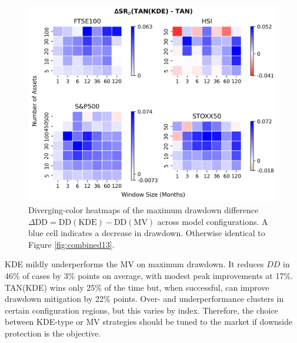 \begin{figure}[H]
  \begin{center}
  \begin{minipage}{1\textwidth}
    \centering
    \includegraphics[width=\textwidth]{images/40_16.png}
  \end{minipage}
  \caption[Heatmap 3]{Diverging-color heatmaps of the maximum drawdown difference $\Delta \text{DD} = \text{DD}(\mathrm{KDE}) - \text{DD}(\mathrm{MV})$ across model configurations. A blue cell indicates a decrease in drawdown. Otherwise identical to Figure \ref{fig:combined13}.}
  \label{fig:combined15}
  \end{center}
  \end{figure}

KDE mildly underperforms the MV on maximum drawdown. It reduces $DD$ in 46\% of cases by 3\% points on average, with modest peak improvements at 17\%. TAN(KDE) wins only 25\% of the time but, when successful, can improve drawdown mitigation by 22\% points. Over- and underperformance clusters in certain configuration regions, but this varies by index. Therefore, the choice between KDE-type or MV strategies should be tuned to the market if downside protection is the objective.

